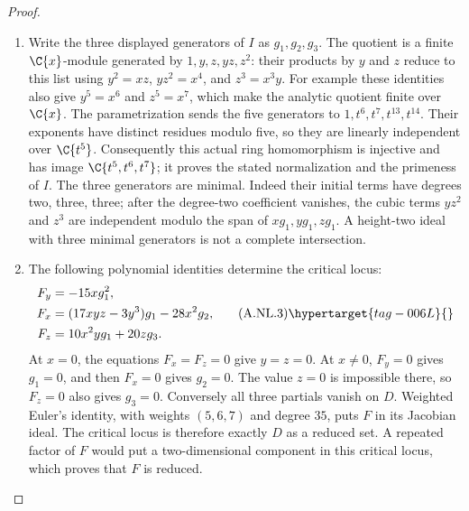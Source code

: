\begin{proof}

\begin{enumerate}[label={$\langle1\rangle$\arabic*.},leftmargin=*]
\item Write the three displayed generators of $I$ as $g_1,g_2,g_3$.
The quotient is a finite $\C\{x\}$-module generated by
$1,y,z,yz,z^2$: their products by $y$ and $z$ reduce to this list
using $y^2=xz$, $yz^2=x^4$, and $z^3=x^3y$.
For example these identities also give $y^5=x^6$ and $z^5=x^7$,
which make the analytic quotient finite over $\C\{x\}$.
The parametrization sends the five generators to
$1,t^6,t^7,t^{13},t^{14}$. Their exponents have distinct residues
modulo five, so they are linearly independent over $\C\{t^5\}$.
Consequently this actual ring homomorphism is injective and has
image $\C\{t^5,t^6,t^7\}$; it proves the stated normalization and
the primeness of $I$. The three generators are minimal. Indeed their
initial terms have degrees two, three, three; after the degree-two
coefficient vanishes, the cubic terms $yz^2$ and $z^3$ are independent
modulo the span of $xg_1,yg_1,zg_1$. A height-two ideal with three
minimal generators is not a complete intersection.

\item The following polynomial identities determine the critical locus:
\[
 \begin{aligned}
 F_y&=-15xg_1^2,\\
 F_x&=(17xyz-3y^3)g_1-28x^2g_2,\\
 F_z&=10x^2yg_1+20zg_3.
 \end{aligned}                                                   \tag{A.NL.3}\hypertarget{tag-006L}{}\label{cdp:eq:A.NL.3}
\]
At $x=0$, the equations $F_x=F_z=0$ give $y=z=0$.
At $x\ne0$, $F_y=0$ gives $g_1=0$, and then $F_x=0$
gives $g_2=0$. The value $z=0$ is impossible there, so $F_z=0$
also gives $g_3=0$. Conversely all three partials vanish on $D$.
Weighted Euler's identity, with weights $(5,6,7)$ and degree $35$,
puts $F$ in its Jacobian ideal. The critical locus is therefore
exactly $D$ as a reduced set. A repeated factor of $F$ would put
a two-dimensional component in this critical locus, which proves
that $F$ is reduced.


\end{enumerate}
\end{proof}
